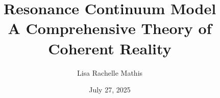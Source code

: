 \documentclass[12pt,oneside]{book}
\begin{document}
\frontmatter 


\title{\Huge \textbf{Resonance Continuum Model} \\
       \Large A Comprehensive Theory of Coherent Reality}
\author{\Large Lisa Rachelle Mathis}
\date{July 27, 2025}
\maketitle
\clearpage

\tableofcontents



\clearpage























\end{document}
